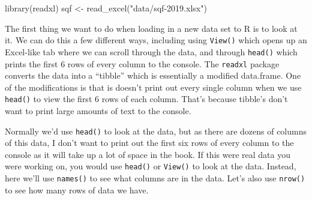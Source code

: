 \documentclass[
]{krantz}
\makeatletter
\newenvironment{Shaded}{\begin{snugshade}}{\end{snugshade}}
\newcommand{\FunctionTok}[1]{\textcolor[rgb]{0,0,0}{#1}}
\newcommand{\NormalTok}[1]{#1}
\newcommand{\OtherTok}[1]{\textcolor[rgb]{0.37,0.37,0.37}{#1}}
\newcommand{\StringTok}[1]{\textcolor[rgb]{0.5,0.5,0.5}{#1}}
\newenvironment{kframe}{%
\medskip{}
\setlength{\fboxsep}{.8em}
 \def\at@end@of@kframe{}%
 \ifinner\ifhmode%
  \def\at@end@of@kframe{\end{minipage}}%
  \begin{minipage}{\columnwidth}%
 \fi\fi%
 \def\FrameCommand##1{\hskip\@totalleftmargin \hskip-\fboxsep
 \colorbox{shadecolor}{##1}\hskip-\fboxsep
     \hskip-\linewidth \hskip-\@totalleftmargin \hskip\columnwidth}%
 \MakeFramed {\advance\hsize-\width
   \@totalleftmargin\z@ \linewidth\hsize
   \@setminipage}}%
 {\par\unskip\endMakeFramed%
 \at@end@of@kframe}
\renewenvironment{Shaded}{\begin{kframe}}{\end{kframe}}
\makeatother
\begin{document}
\begin{Shaded}
\begin{Highlighting}[]
\FunctionTok{library}\NormalTok{(readxl)}
\NormalTok{sqf }\OtherTok{\textless{}{-}} \FunctionTok{read\_excel}\NormalTok{(}\StringTok{"data/sqf{-}2019.xlsx"}\NormalTok{)}
\end{Highlighting}
\end{Shaded}

The first thing we want to do when loading in a new data set to R is to look at it. We can do this a few different ways, including using \texttt{View()} which opens up an Excel-like tab where we can scroll through the data, and through \texttt{head()} which prints the first 6 rows of every column to the console. The \texttt{readxl} package converts the data into a ``tibble'' which is essentially a modified data.frame. One of the modifications is that is doesn't print out every single column when we use \texttt{head()} to view the first 6 rows of each column. That's because tibble's don't want to print large amounts of text to the console.

Normally we'd use \texttt{head()} to look at the data, but as there are dozens of columns of this data, I don't want to print out the first six rows of every column to the console as it will take up a lot of space in the book. If this were real data you were working on, you would use \texttt{head()} or \texttt{View()} to look at the data. Instead, here we'll use \texttt{names()} to see what columns are in the data. Let's also use \texttt{nrow()} to see how many rows of data we have.
\end{document}

